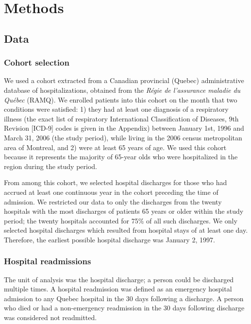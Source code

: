 \documentclass[]{article}\usepackage[]{graphicx}\usepackage[]{color}
\begin{document}
\section{Methods}

\subsection{Data}

\subsubsection{Cohort selection}
We used a cohort extracted from a Canadian provincial (Quebec) administrative database of hospitalizations, obtained from the \emph{Régie de l'assurance maladie du Québec} (RAMQ). We enrolled patients into this cohort on the month that two conditions were satisfied: 1) they had at least one diagnosis of a respiratory illness (the exact list of respiratory International Classification of Diseases, 9th Revision [ICD-9] codes is given in the Appendix) between January 1st, 1996 and March 31, 2006 (the study period), while living in the 2006 census metropolitan area of Montreal, and 2) were at least 65 years of age. We used this cohort because it represents the majority of 65-year olds who were hospitalized in the region during the study period. 

From among this cohort, we selected hospital discharges for those who had accrued at least one continuous year in the cohort preceding the time of admission. We restricted our data to only the discharges from the twenty hospitals with the most discharges of patients 65 years or older within the study period; the twenty hospitals accounted for 75\% of all such discharges.  We only selected hospital discharges which resulted from hospital stays of at least one day. Therefore, the earliest possible hospital discharge was January 2, 1997.

\subsubsection{Hospital readmissions}
The unit of analysis was the hospital discharge; a person could be discharged multiple times. A hospital readmission was defined as an emergency hospital admission to any Quebec hospital in the 30 days following a discharge.  A person who died or had a non-emergency readmission in the 30 days following discharge was considered not readmitted.
\end{document}

